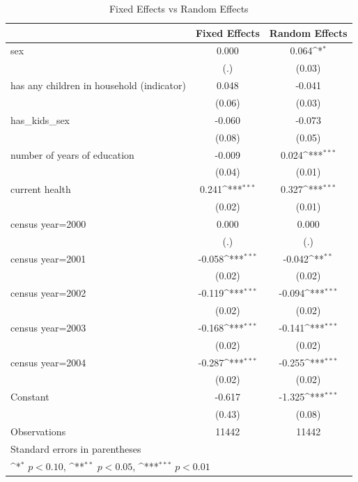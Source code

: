 \begin{table}[htbp]\centering
\def\sym#1{\ifmmode^{#1}\else\(^{#1}\)\fi}
\caption{Fixed Effects vs Random Effects}
\begin{tabular}{l*{2}{c}}
\hline\hline
                    &\multicolumn{1}{c}{Fixed Effects}&\multicolumn{1}{c}{Random Effects}\\
\hline
sex                 &       0.000         &       0.064\sym{*}  \\
                    &         (.)         &      (0.03)         \\
[1em]
has any children in household (indicator)&       0.048         &      -0.041         \\
                    &      (0.06)         &      (0.03)         \\
[1em]
has\_kids\_sex        &      -0.060         &      -0.073         \\
                    &      (0.08)         &      (0.05)         \\
[1em]
number of years of education&      -0.009         &       0.024\sym{***}\\
                    &      (0.04)         &      (0.01)         \\
[1em]
current health      &       0.241\sym{***}&       0.327\sym{***}\\
                    &      (0.02)         &      (0.01)         \\
[1em]
census year=2000    &       0.000         &       0.000         \\
                    &         (.)         &         (.)         \\
[1em]
census year=2001    &      -0.058\sym{***}&      -0.042\sym{**} \\
                    &      (0.02)         &      (0.02)         \\
[1em]
census year=2002    &      -0.119\sym{***}&      -0.094\sym{***}\\
                    &      (0.02)         &      (0.02)         \\
[1em]
census year=2003    &      -0.168\sym{***}&      -0.141\sym{***}\\
                    &      (0.02)         &      (0.02)         \\
[1em]
census year=2004    &      -0.287\sym{***}&      -0.255\sym{***}\\
                    &      (0.02)         &      (0.02)         \\
[1em]
Constant            &      -0.617         &      -1.325\sym{***}\\
                    &      (0.43)         &      (0.08)         \\
\hline
Observations        &       11442         &       11442         \\
\hline\hline
\multicolumn{3}{l}{\footnotesize Standard errors in parentheses}\\
\multicolumn{3}{l}{\footnotesize \sym{*} \(p<0.10\), \sym{**} \(p<0.05\), \sym{***} \(p<0.01\)}\\
\end{tabular}
\end{table}
